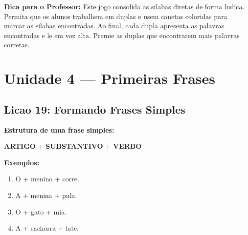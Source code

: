 \begin{dica}
\textbf{Dica para o Professor:} Este jogo consolida as silabas diretas de forma ludica. Permita que os alunos trabalhem em duplas e usem canetas coloridas para marcar as silabas encontradas. Ao final, cada dupla apresenta as palavras encontradas e le em voz alta. Premie as duplas que encontrarem mais palavras corretas.
\end{dica}



\chapter{Unidade 4 --- Primeiras Frases}

\section{Licao 19: Formando Frases Simples}

\rotinasimples
{}



\textbf{Estrutura de uma frase simples:}
\begin{center}
\textbf{ARTIGO} + \textbf{SUBSTANTIVO} + \textbf{VERBO}
\end{center}

\textbf{Exemplos:}
\begin{enumerate}[leftmargin=2cm]
  \item \textcolor{primary}{O} + \textcolor{secondary}{menino} + \textcolor{accent}{corre.}
  \item \textcolor{primary}{A} + \textcolor{secondary}{menina} + \textcolor{accent}{pula.}
  \item \textcolor{primary}{O} + \textcolor{secondary}{gato} + \textcolor{accent}{mia.}
  \item \textcolor{primary}{A} + \textcolor{secondary}{cachorra} + \textcolor{accent}{late.}
\end{enumerate}

